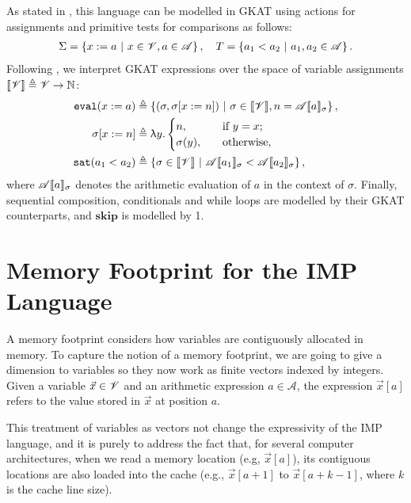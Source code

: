 As stated in \cite{GKAT}, this language can be modelled in GKAT using actions for assignments and primitive tests for comparisons as follows:
\begin{align}
\Sigma=\left\{x:=a\ |\ x\in \mathscr{V}, a\in \mathscr{A}\right\}, \quad T=\left\{a_1 < a_2\ |\ a_1,a_2\in \mathscr{A}\right\}.
\end{align}
Following \cite{GKAT}, we interpret GKAT expressions over the space of variable assignments $\llbracket \mathscr{V}\rrbracket\triangleq\mathscr{V} \rightarrow\mathbb{N}$:
\begin{align*}
\eval(x:=a)&\triangleq \set{(\sigma, \sigma[x:=n])\ |\  \sigma \in \semantics{\Variable}, n=\mathscr{A}\semantics{a}_\sigma},\\
\sigma[x:=n]&\triangleq \uplambda y \ldotp 
	\begin{cases}
		n, \quad &\text{if $y=x$};\\
		\sigma(y), \quad&\text{otherwise},
	\end{cases}\\
\sat(a_1<a_2)&\triangleq \set{\sigma \in \semantics{\Variable}\ |\ \mathscr{A}\semantics{a_1}_{\sigma} < \mathscr{A}\semantics{a_2}_{\sigma}},
\end{align*}
where $\mathscr{A}\llbracket a\rrbracket_\sigma$ denotes the arithmetic evaluation of $a$ in the context of $\sigma$. Finally, sequential composition, conditionals and while loops are modelled by their GKAT counterparts, and $\mathbf{skip}$ is modelled by 1.


\section{Memory Footprint for the IMP Language}
A memory footprint considers how variables are contiguously allocated in memory. To capture the notion of a memory footprint, we are going to give a dimension to variables so they now work as finite vectors indexed by integers.  Given a variable $\vec{x}\in \mathscr{V}$ and an arithmetic expression $a \in \mathscr{A}$, the expression $\vec{x}[a]$ refers to the value stored in $\vec{x}$ at position $a$.

This treatment of variables as vectors not change the expressivity of the IMP language, and it is purely to address the fact that, for several computer architectures, when we read a memory location (e.g, $\vec{x}[a]$), its contiguous locations are also loaded into the cache (e.g., $\vec{x}[a+1]$ to $\vec{x}[a+k-1]$, where $k$ is the cache line size).

